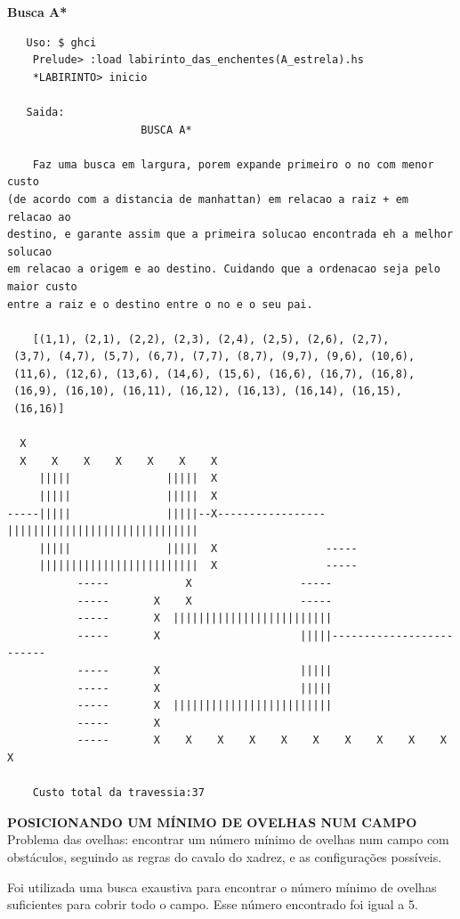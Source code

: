 \documentclass[10pt]{article}
\begin{document}
\pagebreak

\textbf{Busca A*}
\begin{verbatim}
   Uso: $ ghci
	Prelude> :load labirinto_das_enchentes(A_estrela).hs
	*LABIRINTO> inicio

   Saida:
		             BUSCA A*

	Faz uma busca em largura, porem expande primeiro o no com menor custo
(de acordo com a distancia de manhattan) em relacao a raiz + em relacao ao 
destino, e garante assim que a primeira solucao encontrada eh a melhor solucao 
em relacao a origem e ao destino. Cuidando que a ordenacao seja pelo maior custo
entre a raiz e o destino entre o no e o seu pai.

	[(1,1), (2,1), (2,2), (2,3), (2,4), (2,5), (2,6), (2,7),
 (3,7), (4,7), (5,7), (6,7), (7,7), (8,7), (9,7), (9,6), (10,6),
 (11,6), (12,6), (13,6), (14,6), (15,6), (16,6), (16,7), (16,8),
 (16,9), (16,10), (16,11), (16,12), (16,13), (16,14), (16,15),
 (16,16)]

  X
  X    X    X    X    X    X    X
     |||||               |||||  X
     |||||               |||||  X
-----|||||               |||||--X-----------------||||||||||||||||||||||||||||||
     |||||               |||||  X                 -----
     |||||||||||||||||||||||||  X                 -----
	       -----            X                 -----
	       -----       X    X                 -----
	       -----       X  |||||||||||||||||||||||||
	       -----       X                      |||||-------------------------
	       -----       X                      |||||
	       -----       X                      |||||
	       -----       X  |||||||||||||||||||||||||
	       -----       X
	       -----       X    X    X    X    X    X    X    X    X    X    X

	Custo total da travessia:37
\end{verbatim}

\pagebreak

\textbf{POSICIONANDO UM MÍNIMO DE OVELHAS NUM CAMPO} \\


\vspace{3mm}
Problema das ovelhas: encontrar um número mínimo de ovelhas num campo com obstáculos, seguindo as regras do cavalo do xadrez, e as configurações possíveis. \\
\vspace{3mm}

Foi utilizada uma busca exaustiva para encontrar o número mínimo de ovelhas suficientes para cobrir todo o campo. Esse número encontrado foi igual a 5.\\
\end{document}
